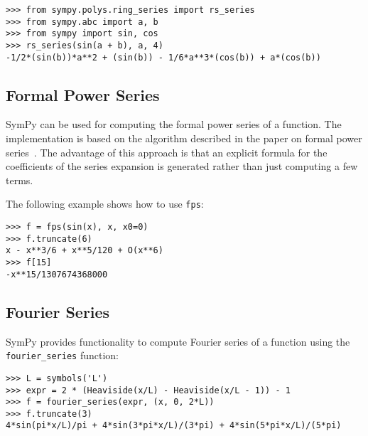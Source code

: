\begin{verbatim}
>>> from sympy.polys.ring_series import rs_series
>>> from sympy.abc import a, b
>>> from sympy import sin, cos
>>> rs_series(sin(a + b), a, 4)
-1/2*(sin(b))*a**2 + (sin(b)) - 1/6*a**3*(cos(b)) + a*(cos(b))
\end{verbatim}

\subsection{Formal Power Series}

SymPy can be used for computing the formal power series of a function.
The implementation is based on the algorithm described in the paper on
formal power series~\cite{Gruntz93formalpower}.  The advantage of this approach is
that an explicit formula for the coefficients of the series expansion is generated
rather than just computing a few terms.

The following example shows how to use \texttt{fps}:

\begin{verbatim}
>>> f = fps(sin(x), x, x0=0)
>>> f.truncate(6)
x - x**3/6 + x**5/120 + O(x**6)
>>> f[15]
-x**15/1307674368000
\end{verbatim}

\subsection{Fourier Series}

SymPy provides functionality to compute Fourier series of a function using the
\texttt{fourier\_series} function:

\begin{verbatim}
>>> L = symbols('L')
>>> expr = 2 * (Heaviside(x/L) - Heaviside(x/L - 1)) - 1
>>> f = fourier_series(expr, (x, 0, 2*L))
>>> f.truncate(3)
4*sin(pi*x/L)/pi + 4*sin(3*pi*x/L)/(3*pi) + 4*sin(5*pi*x/L)/(5*pi)
\end{verbatim}
